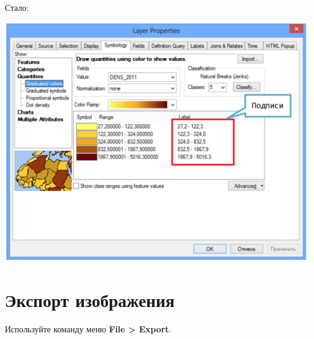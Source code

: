 \documentclass[12pt,]{book}
\begin{document}
Стало:

\includegraphics{images/Appendix/image63.png}

\hypertarget{manual-export}{%
\chapter{Экспорт изображения}\label{manual-export}}

Используйте команду меню \textbf{File \textgreater{} Export}.

\printbibliography
\end{document}
